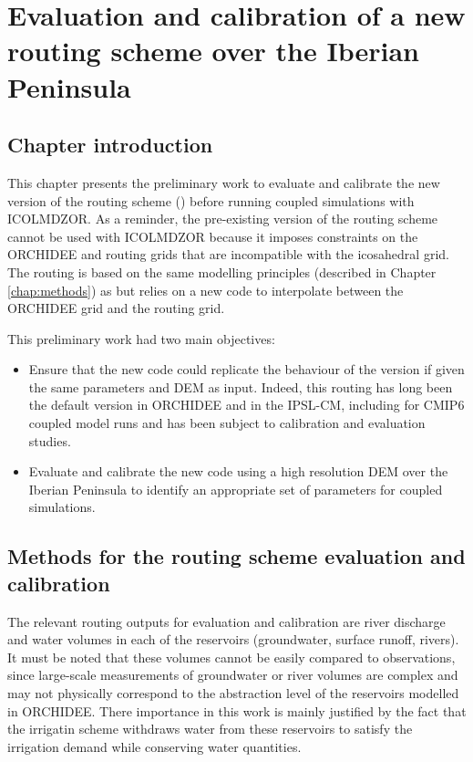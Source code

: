 \chapter{Evaluation and calibration of a new routing scheme over the Iberian Peninsula}
\label{chap:routing}
\minitoc
\pagebreak

\section{Chapter introduction}

This chapter presents the preliminary work to evaluate and calibrate the new version of the routing scheme (\native) before running coupled simulations with ICOLMDZOR. As a reminder, the pre-existing version of the routing scheme \std cannot be used with ICOLMDZOR because it imposes constraints on the ORCHIDEE and routing grids that are incompatible with the icosahedral grid.
The \native routing is based on the same modelling principles (described in Chapter \ref{chap:methods}) as \std but relies on a new code to interpolate between the ORCHIDEE grid and the routing grid. 

This preliminary work had two main objectives:
\begin{itemize}
    \item Ensure that the new code could replicate the behaviour of the \std version if given the same parameters and DEM as input. 
    Indeed, this routing has long been the default version in ORCHIDEE and in the IPSL-CM, including for CMIP6 coupled model runs and has been subject to calibration and evaluation studies. %
    \item Evaluate and calibrate the new code using a high resolution DEM over the Iberian Peninsula to identify an appropriate set of parameters for coupled simulations.
\end{itemize}


\section{Methods for the routing scheme evaluation and calibration}


The relevant routing outputs for evaluation and calibration are river discharge and water volumes in each of the reservoirs (groundwater, surface runoff, rivers). 
It must be noted that these volumes cannot be easily compared to observations, since large-scale measurements of groundwater or river volumes are complex and may not physically correspond to the abstraction level of the reservoirs modelled in ORCHIDEE.
There importance in this work is mainly justified by the fact that the irrigatin scheme withdraws water from these reservoirs to satisfy the irrigation demand while conserving water quantities.

